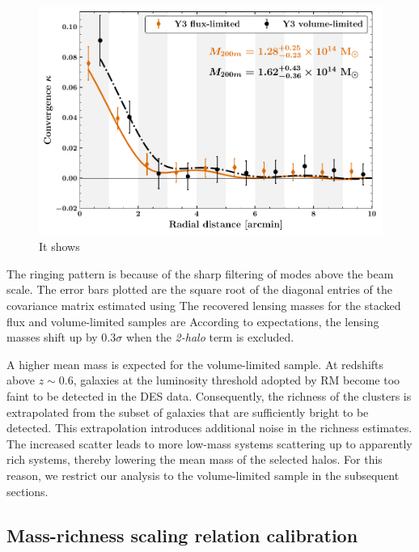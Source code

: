 \begin{figure}
\includegraphics[width=\linewidth]{figs/kappa_model_MF_y3_v6_4_22_full_vl_radprf_JODY.pdf}
\caption{It shows}
\label{fig:fig_QE_stacked_maps}
\end{figure}

The ringing pattern is because of the sharp filtering of modes above the \sptpol{} beam scale. 
The error bars plotted are the square root of the diagonal entries of the covariance matrix estimated using %
The recovered lensing masses for the stacked flux and volume-limited samples are %
According to expectations, the lensing masses shift up by 0.3$\sigma$ when the {\it 2-halo} term is excluded.


A higher mean mass is expected for the volume-limited sample. 
At redshifts above $z\sim 0.6$, galaxies at the luminosity threshold adopted by RM become too faint to be detected in the DES data. 
Consequently, the richness of the clusters is extrapolated from the subset of galaxies that are sufficiently bright to be detected. 
This extrapolation introduces additional noise in the richness estimates.
The increased scatter leads to more low-mass systems scattering up to apparently rich systems, thereby lowering the mean mass of the selected halos. 
For this reason, we restrict our analysis to the volume-limited sample in the subsequent sections. 
\subsection{Mass-richness \ML{} scaling relation calibration}\label{sec_ML_scaling}

